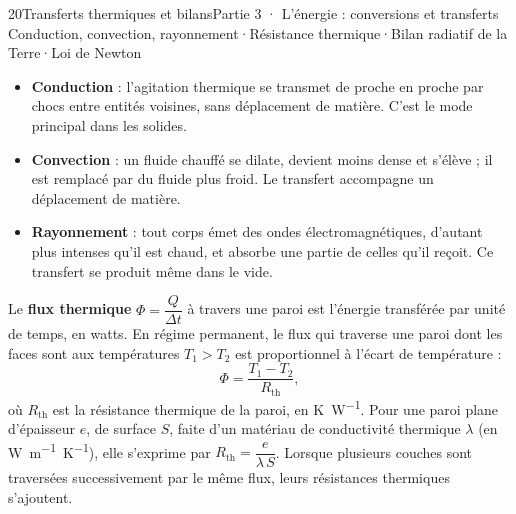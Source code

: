 \begin{ouverture}[transferts]{20}{Transferts thermiques et bilans}{Partie 3 · L'énergie : conversions et transferts}
{Conduction, convection, rayonnement\enspace·\enspace Résistance thermique\enspace·\enspace Bilan radiatif de la Terre\enspace·\enspace Loi de Newton}
\end{ouverture}
\essentiel
{}
\begin{definition}
\begin{itemize}
\item \textbf{Conduction} : l'agitation thermique se transmet de proche en proche par chocs entre entités voisines,
sans déplacement de matière. C'est le mode principal dans les solides.
\item \textbf{Convection} : un fluide chauffé se dilate, devient moins dense et s'élève ; il est remplacé par du fluide
plus froid. Le transfert accompagne un déplacement de matière.
\item \textbf{Rayonnement} : tout corps émet des ondes électromagnétiques, d'autant plus intenses qu'il est chaud, et
absorbe une partie de celles qu'il reçoit. Ce transfert se produit même dans le vide.
\end{itemize}
\end{definition}
\begin{loi}
Le \textbf{flux thermique} $\Phi=\dfrac{Q}{\Delta t}$ à travers une paroi est l'énergie transférée par unité de temps, en
watts. En régime permanent, le flux qui traverse une paroi dont les faces sont aux températures $T_1>T_2$ est
proportionnel à l'écart de température :
\[\Phi=\frac{T_1-T_2}{R_\mathrm{th}},\]
où $R_\mathrm{th}$ est la résistance thermique de la paroi, en \unit{K.W^{-1}}. Pour une paroi plane d'épaisseur $e$, de surface
$S$, faite d'un matériau de conductivité thermique $\lambda$ (en \unit{W.m^{-1}.K^{-1}}), elle s'exprime par
$R_\mathrm{th}=\dfrac{e}{\lambda\,S}$. Lorsque plusieurs couches sont traversées successivement par le même flux, leurs
résistances thermiques s'ajoutent.
\end{loi}
